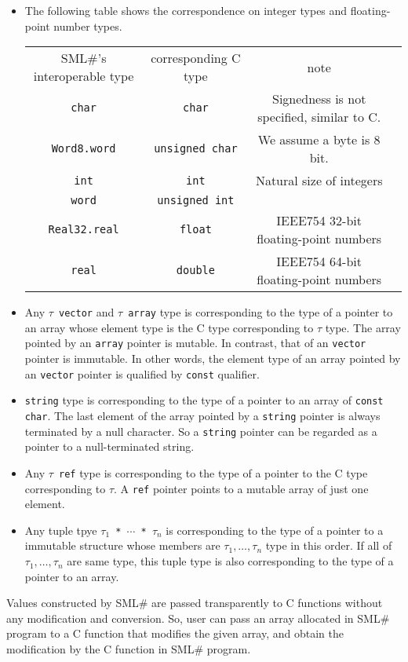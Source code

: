 \documentclass{jbook}
\newcommand{\smlsharp}{SML\#}
\begin{document}
\begin{itemize}
\item The following table shows the correspondence on integer types and
floating-point number types.
\begin{center}
\begin{tabular}{|c|c|c|l|}
\hline
\smlsharp{}'s interoperable type & corresponding C type & note\\
{\tt char} & {\tt char} & Signedness is not specified, similar to C.\\
{\tt Word8.word} & {\tt unsigned char} & We assume a byte is 8 bit.\\
{\tt int} & {\tt int} & Natural size of integers\\
{\tt word} & {\tt unsigned int} &\\
{\tt Real32.real} & {\tt float} & IEEE754 32-bit floating-point numbers\\
{\tt real} & {\tt double} & IEEE754 64-bit floating-point numbers
\end{tabular}
\end{center}
\item
	Any {\tt $\tau$ vector} and {\tt $\tau$ array} type is
corresponding to the type of a pointer to an array whose element type is
the C type corresponding to $\tau$ type.
	The array pointed by an {\tt array} pointer is mutable.
	In contrast, that of an {\tt vector} pointer is immutable.
	In other words,
the element type of an array pointed by an {\tt vector} pointer is qualified
by {\tt const} qualifier.
\item
	{\tt string} type is corresponding to the type of a pointer to an
array of {\tt const char}.
	The last element of the array pointed by a {\tt string} pointer is
always terminated by a null character.
	So a {\tt string} pointer can be regarded as a pointer to a
null-terminated string.
\item
	Any {\tt $\tau$ ref} type is corresponding to the type of a pointer to
the C type corresponding to $\tau$.
	A {\tt ref} pointer points to a mutable array of just one element.
\item
	Any tuple tpye {\tt $\tau_1$ * $\cdots$ * $\tau_n$} is corresponding to
the type of a pointer to a immutable structure
whose members are $\tau_1,\ldots,\tau_n$ type in this order.
	If all of $\tau_1,\ldots,\tau_n$ are same type,
this tuple type is also corresponding to the type of a pointer to an array.
\end{itemize}
	Values constructed by \smlsharp{} are passed transparently to
C functions without any modification and conversion.
	So, user can pass an array allocated in \smlsharp{} program to
a C function that modifies the given array, and obtain the modification
by the C function in \smlsharp{} program.
\end{document}
